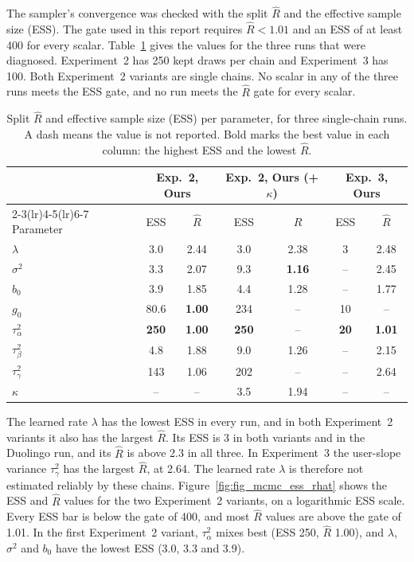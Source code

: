 The sampler's convergence was checked with the split $\hat R$ and the effective sample size (ESS). The gate used in
this report requires $\hat R < 1.01$ and an ESS of at least 400 for every scalar. Table~\ref{tab:mcmc} gives the values
for the three runs that were diagnosed. Experiment~2 has 250 kept draws per chain and Experiment~3 has 100. Both
Experiment~2 variants are single chains. No scalar in any of the three runs meets the ESS gate, and no run meets the
$\hat R$ gate for every scalar.

\begin{table}[htbp]
  \centering
  \caption[MCMC diagnostics]{Split $\hat R$ and effective sample size (ESS) per parameter, for three single-chain
    runs. A dash means the value is not reported. Bold marks the best value in each column: the highest ESS and the
    lowest $\hat R$.}
  \label{tab:mcmc}
  \begin{tabular}{@{}lcccccc@{}}
    \toprule
    & \multicolumn{2}{c}{Exp.\ 2, Ours} & \multicolumn{2}{c}{Exp.\ 2, Ours (+$\kappa$)} & \multicolumn{2}{c}{Exp.\ 3, Ours} \\
    \cmidrule(lr){2-3}\cmidrule(lr){4-5}\cmidrule(lr){6-7}
    Parameter & ESS & $\hat R$ & ESS & $\hat R$ & ESS & $\hat R$ \\
    \midrule
    $\lambda$ & 3.0 & 2.44 & 3.0 & 2.38 & 3 & 2.48 \\
    $\sigma^2$ & 3.3 & 2.07 & 9.3 & \textbf{1.16} & -- & 2.45 \\
    $b_0$ & 3.9 & 1.85 & 4.4 & 1.28 & -- & 1.77 \\
    $g_0$ & 80.6 & \textbf{1.00} & 234 & -- & 10 & -- \\
    $\tau^2_\alpha$ & \textbf{250} & \textbf{1.00} & \textbf{250} & -- & \textbf{20} & \textbf{1.01} \\
    $\tau^2_\beta$ & 4.8 & 1.88 & 9.0 & 1.26 & -- & 2.15 \\
    $\tau^2_\gamma$ & 143 & 1.06 & 202 & -- & -- & 2.64 \\
    $\kappa$ & -- & -- & 3.5 & 1.94 & -- & -- \\
    \bottomrule
  \end{tabular}
\end{table}

The learned rate $\lambda$ has the lowest ESS in every run, and in both Experiment~2 variants it also has the largest $\hat R$. Its ESS is 3 in both variants and in the Duolingo run, and its $\hat R$ is above 2.3 in all three. In Experiment~3 the user-slope variance $\tau^2_\gamma$ has the largest $\hat R$, at 2.64. The learned rate $\lambda$ is therefore
not estimated reliably by these chains. Figure~\ref{fig:fig_mcmc_ess_rhat} shows the ESS and $\hat R$ values for the two
Experiment~2 variants, on a logarithmic ESS scale. Every ESS bar is below the gate of 400, and most $\hat R$ values are
above the gate of 1.01. In the first Experiment~2 variant, $\tau^2_\alpha$ mixes best (ESS 250, $\hat R$ 1.00), and $\lambda$, $\sigma^2$ and $b_0$ have the lowest ESS (3.0, 3.3 and 3.9).

